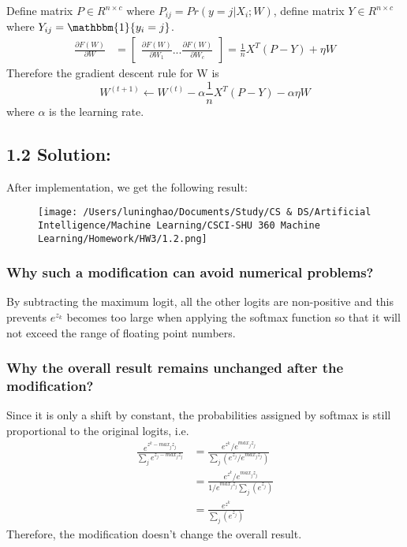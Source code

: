 \documentclass{article}
\begin{document}
Define matrix $P \in R^{n \times c}$ where $P_{ij} = Pr(y = j|X_i;W)$, define matrix $Y \in R^{n \times c}$ where $Y_{ij} = \mathbbm{1}\{y_i = j\}$. 
\begin{align*}
    \frac{\partial F(W)}{\partial W} 
    &= \begin{bmatrix}
    \frac{\partial F(W)}{\partial W_1} ... \frac{\partial F(W)}{\partial W_c} 
    \end{bmatrix} = \frac{1}{n} X^T (P - Y) + \eta W
\end{align*}
Therefore the gradient descent rule for W is
\[W^{(t+1)} \leftarrow W^{(t)} - \alpha \frac{1}{n} X^T (P - Y) - \alpha \eta W\]
where $\alpha$ is the learning rate.

\subsection*{1.2 Solution:}
After implementation, we get the following result: 
\begin{figure}[h]
    \centering
    \texttt{[image: /Users/luninghao/Documents/Study/CS \& DS/Artificial Intelligence/Machine Learning/CSCI-SHU 360 Machine Learning/Homework/HW3/1.2.png]}
\end{figure}
\subsubsection*{Why such a modification can avoid numerical problems?}
By subtracting the maximum logit, all the other logits are non-positive and this prevents $e^{z_k}$ becomes too large when applying the softmax function so that it will not exceed the range of floating point numbers.
\subsubsection*{Why the overall result remains unchanged after the modification?}
Since it is only a shift by constant, the probabilities assigned by softmax is still proportional to the original logits, i.e.
\begin{align*}
    \frac{e^{z^k - max_j z_j}}{\sum_{j}e^{z_j - max_j z_j}} &= \frac{e^{z^k} / e^{max_j z_j}}{\sum_{j} (e^{z_j} / e^{max_j z_j})} \\
                                                            &= \frac{e^{z^k} / e^{max_j z_j}}{1/e^{max_j z_j} \sum_{j} (e^{z_j})} \\
                                                            &= \frac{e^{z^k}}{\sum_{j} (e^{z_j})}
\end{align*}
Therefore, the modification doesn't change the overall result.
\end{document}
